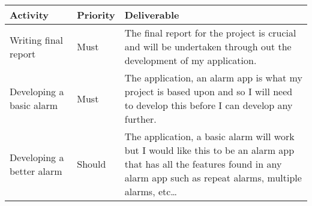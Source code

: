 \begin{longtable}[]{@{}lll@{}}
\toprule
\begin{minipage}[b]{0.22\columnwidth}\raggedright\strut
Activity\strut
\end{minipage} & \begin{minipage}[b]{0.10\columnwidth}\raggedright\strut
Priority\strut
\end{minipage} & \begin{minipage}[b]{0.60\columnwidth}\raggedright\strut
Deliverable\strut
\end{minipage}\tabularnewline
\midrule
\endhead
\begin{minipage}[t]{0.22\columnwidth}\raggedright\strut
Writing final report\strut
\end{minipage} & \begin{minipage}[t]{0.10\columnwidth}\raggedright\strut
Must\strut
\end{minipage} & \begin{minipage}[t]{0.60\columnwidth}\raggedright\strut
The final report for the project is crucial and will be undertaken
through out the development of my application.\strut
\end{minipage}\tabularnewline
\begin{minipage}[t]{0.22\columnwidth}\raggedright\strut
Developing a basic alarm\strut
\end{minipage} & \begin{minipage}[t]{0.10\columnwidth}\raggedright\strut
Must\strut
\end{minipage} & \begin{minipage}[t]{0.60\columnwidth}\raggedright\strut
The application, an alarm app is what my project is based upon and so I
will need to develop this before I can develop any further.\strut
\end{minipage}\tabularnewline
\begin{minipage}[t]{0.22\columnwidth}\raggedright\strut
Developing a better alarm\strut
\end{minipage} & \begin{minipage}[t]{0.10\columnwidth}\raggedright\strut
Should\strut
\end{minipage} & \begin{minipage}[t]{0.60\columnwidth}\raggedright\strut
The application, a basic alarm will work but I would like this to be an
alarm app that has all the features found in any alarm app such as
repeat alarms, multiple alarms, etc\ldots{}\strut
\end{minipage}\tabularnewline

\end{longtable}
